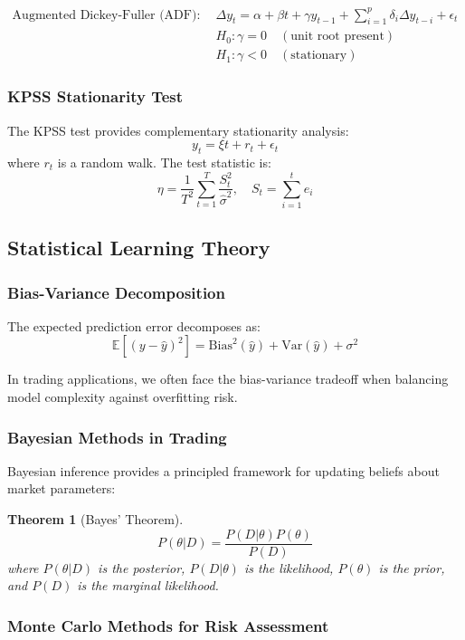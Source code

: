\documentclass[11pt,letterpaper,openany]{book}
\newtheorem{theorem}{Theorem}[chapter]
\newcommand{\Var}{\mathrm{Var}}
\begin{document}
\begin{align}
\text{Augmented Dickey-Fuller (ADF):} \quad & \Delta y_t = \alpha + \beta t + \gamma y_{t-1} + \sum_{i=1}^p \delta_i \Delta y_{t-i} + \epsilon_t \\
&H_0: \gamma = 0 \quad (\text{unit root present}) \\
&H_1: \gamma < 0 \quad (\text{stationary})
\end{align}

\subsubsection{KPSS Stationarity Test}

The KPSS test provides complementary stationarity analysis:
\[
y_t = \xi t + r_t + \epsilon_t
\]
where $r_t$ is a random walk. The test statistic is:
\[
\eta = \frac{1}{T^2} \sum_{t=1}^T \frac{S_t^2}{\hat{\sigma}^2}, \quad S_t = \sum_{i=1}^t e_i
\]

\subsection{Statistical Learning Theory}

\subsubsection{Bias-Variance Decomposition}

The expected prediction error decomposes as:
\[
\mathbb{E}[(y - \hat{y})^2] = \mathrm{Bias}^2(\hat{y}) + \Var(\hat{y}) + \sigma^2
\]

In trading applications, we often face the bias-variance tradeoff when balancing model complexity against overfitting risk.

\subsubsection{Bayesian Methods in Trading}

Bayesian inference provides a principled framework for updating beliefs about market parameters:

\begin{theorem}[Bayes' Theorem]
\[
P(\theta|D) = \frac{P(D|\theta) P(\theta)}{P(D)}
\]
where $P(\theta|D)$ is the posterior, $P(D|\theta)$ is the likelihood, $P(\theta)$ is the prior, and $P(D)$ is the marginal likelihood.
\end{theorem}

\subsubsection{Monte Carlo Methods for Risk Assessment}
\end{document}
